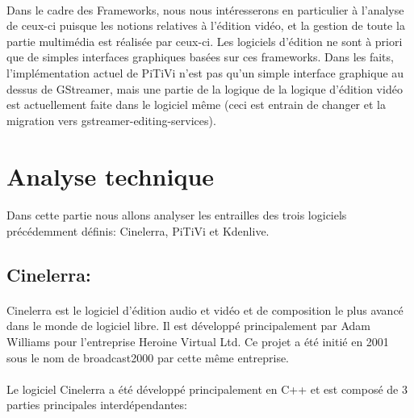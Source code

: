 \paragraph {}

Dans le cadre des Frameworks, nous nous intéresserons en particulier
à l'analyse de ceux-ci puisque les notions relatives à l'édition
vidéo, et la gestion de toute la partie multimédia est réalisée
par ceux-ci. Les logiciels d'édition ne sont à priori que de simples
interfaces graphiques basées sur ces frameworks. Dans les faits,
l'implémentation actuel de PiTiVi n'est pas qu'un simple interface
graphique au dessus de GStreamer, mais une partie de la logique de la
logique d'édition vidéo est actuellement faite dans le logiciel même
(ceci est entrain de changer et la migration \cite{PitviPortToGes}
vers gstreamer-editing-services\cite{PresentationOfGes}).

\newpage \section{Analyse technique}

\paragraph {}

Dans cette partie nous allons analyser les entrailles des trois logiciels
précédemment définis: Cinelerra, PiTiVi et Kdenlive.

\subsection{Cinelerra:}

\paragraph {}

Cinelerra est le logiciel d'édition audio et vidéo et de composition
le plus avancé dans le monde de logiciel libre. Il est développé
principalement par Adam Williams pour l'entreprise Heroine Virtual
Ltd. Ce projet a été initié en 2001 sous le nom de broadcast2000 par
cette même entreprise.

\paragraph{}

Le logiciel Cinelerra a été développé principalement en C++ et est
composé de 3 parties principales interdépendantes:


